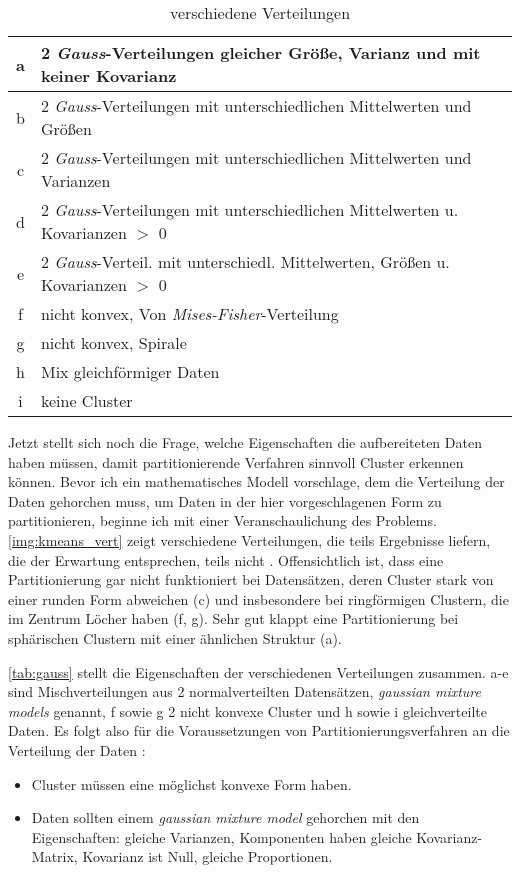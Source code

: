 \documentclass[a4paper,12pt,twoside]{article}
\newcommand{\Fachbegriff}[1]{\textit{#1}}
\begin{document}
\begin{table}
\centering
\begin{tabular}{|c|l|}
  \hline 
  a & 2 \Fachbegriff{Gauss}-Verteilungen gleicher Größe, Varianz und mit keiner Kovarianz \\ 
  \hline 
  b & 2 \Fachbegriff{Gauss}-Verteilungen mit unterschiedlichen Mittelwerten und Größen \\ 
  \hline 
  c & 2 \Fachbegriff{Gauss}-Verteilungen mit unterschiedlichen Mittelwerten und Varianzen \\ 
  \hline 
  d & 2 \Fachbegriff{Gauss}-Verteilungen mit unterschiedlichen Mittelwerten u. Kovarianzen $>$ 0 \\ 
  \hline 
  e & 2 \Fachbegriff{Gauss}-Verteil. mit unterschiedl.  Mittelwerten, Größen u. Kovarianzen $>$ 0 \\ 
  \hline 
  f & nicht konvex, Von \Fachbegriff{Mises-Fisher}-Verteilung \\ 
  \hline 
  g & nicht konvex, Spirale \\ 
  \hline 
  h & Mix gleichförmiger Daten \\ 
  \hline 
  i & keine Cluster \\ 
  \hline
\end{tabular}   
  \caption{verschiedene Verteilungen}
  \label{tab:gauss}
\end{table}

Jetzt stellt sich noch die Frage, welche Eigenschaften die aufbereiteten Daten haben müssen, damit partitionierende Verfahren sinnvoll Cluster erkennen können. Bevor ich ein mathematisches Modell vorschlage, dem die Verteilung der Daten gehorchen muss, um Daten in der hier vorgeschlagenen Form zu partitionieren, beginne ich mit einer Veranschaulichung des Problems. \autoref{img:kmeans_vert} zeigt verschiedene Verteilungen, die teils Ergebnisse liefern, die der Erwartung entsprechen, teils nicht \autocite[Datengenerierung in R:][]{StanislasMorbieu.2018}. Offensichtlich ist, dass eine Partitionierung gar nicht funktioniert bei Datensätzen, deren Cluster stark von einer runden Form abweichen (c) und insbesondere bei ringförmigen Clustern, die im Zentrum Löcher haben (f, g). Sehr gut klappt eine Partitionierung bei sphärischen Clustern mit einer ähnlichen Struktur (a). \autocite[vgl.][]{Robinson.2015}

\autoref{tab:gauss} stellt die Eigenschaften der verschiedenen Verteilungen zusammen. a-e sind Mischverteilungen aus 2 normalverteilten Datensätzen, \Fachbegriff{gaussian mixture models} genannt, f sowie g 2 nicht konvexe Cluster und h sowie i gleichverteilte Daten.  Es folgt also für die Voraussetzungen von Partitionierungsverfahren an die Verteilung der Daten \autocite[vgl.][]{Rosenberg.2015}:
\begin{itemize}
\item Cluster müssen eine möglichst konvexe Form haben.
\item Daten sollten einem \Fachbegriff{gaussian mixture model} gehorchen mit den Eigenschaften: gleiche Varianzen, Komponenten haben gleiche Kovarianz-Matrix, Kovarianz ist Null, gleiche Proportionen.
\end{itemize}
\end{document}
